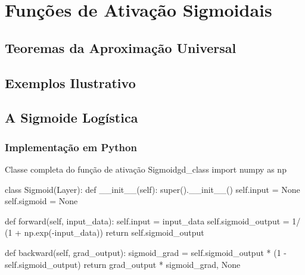 
\chapter{Funções de Ativação Sigmoidais}
\label{cap:ativacao-sigmoidais}



\section{Teoremas da Aproximação Universal}

\section{Exemplos Ilustrativo}

\section{A Sigmoide Logística}

\subsection{Implementação em Python}

\begin{codelisting}{Classe completa do função de ativação Sigmoid}{gd_class}
import numpy as np

class Sigmoid(Layer):
    def __init__(self):
        super().__init__()
        self.input = None
        self.sigmoid = None

    def forward(self, input_data):
        self.input = input_data
        self.sigmoid_output = 1/ (1 + np.exp(-input_data))
        return self.sigmoid_output

    def backward(self, grad_output):
        sigmoid_grad = self.sigmoid_output * (1 - self.sigmoid_output)
        return grad_output * sigmoid_grad, None
\end{codelisting}

